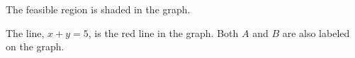 \begin{subquestions}
\begin{subsubquestions}

\subsubquestion

The feasible region is shaded in the graph.


\subsubquestion

The line, $x+y=5$, is the red line in the graph. Both $A$ and $B$ are also labeled on the graph.

\end{subsubquestions}

\end{subquestions}
